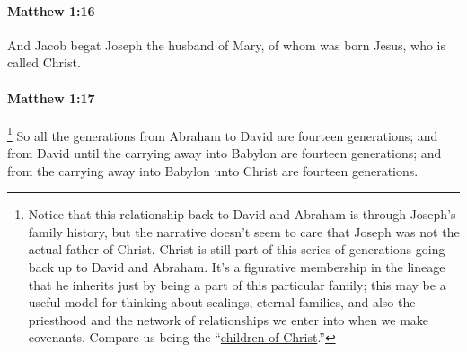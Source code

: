 		\paragraph{Matthew 1:16} %
			\label{MATTHEW-1-16}

			And Jacob begat Joseph the husband of Mary, of whom was born Jesus, who is called Christ.

			\begin{framed}
			\scriptsize
				\begin{compactdesc}
					\item[SBLG] 
				\end{compactdesc}
			\end{framed}

		\paragraph{Matthew 1:17} %
			\label{MATTHEW-1-17}

				\footnote{%
					Notice that this relationship back to David and Abraham is through Joseph's family history, but the narrative doesn't seem to care that Joseph was not the actual father of Christ. Christ is still part of this series of generations going back up to David and Abraham. It's a figurative membership in the lineage that he inherits just by being a part of this particular family; this may be a useful model for thinking about sealings, eternal families, and also the priesthood and the network of relationships we enter into when we make covenants. Compare us being the ``\hyperref[NEWBIRTH-children-christ]{children of Christ}.''
					}
			So all the generations from Abraham to David are fourteen generations; and from David until the carrying away into Babylon are fourteen generations; and from the carrying away into Babylon unto Christ are fourteen generations.


